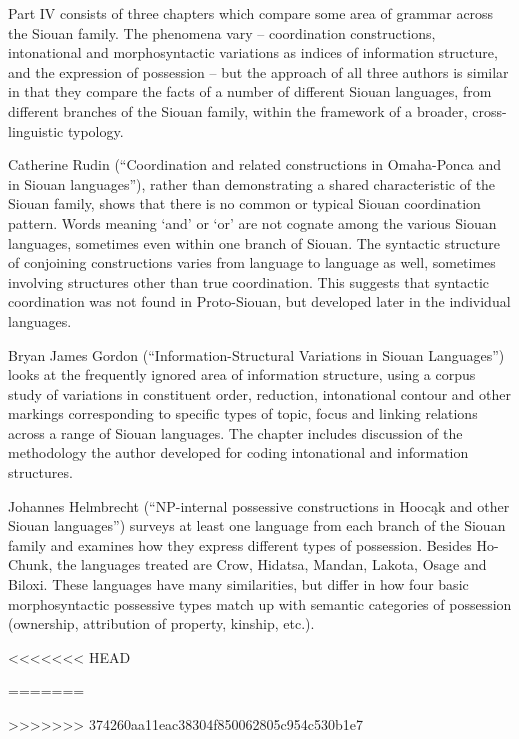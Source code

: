 \begin{refsection}

Part IV consists of three chapters which compare some area of grammar across the Siouan family. The phenomena vary -- coordination constructions, intonational and morphosyntactic variations as indices of information structure, and the expression of possession -- but the approach of all three authors is similar in that they compare the facts of a number of different Siouan languages, from different branches of the Siouan family, within the framework of a broader, cross-linguistic typology.

Catherine Rudin (``Coordination and related constructions in Omaha-Ponca and in Siouan languages''), rather than demonstrating a shared characteristic of the Siouan family, shows that there is no common or typical Siouan coordination pattern. Words meaning `and' or `or' are not cognate among the various Siouan languages, sometimes even within one branch of Siouan. The syntactic structure of conjoining constructions varies from language to language as well, sometimes involving structures other than true coordination. This suggests that syntactic coordination was not found in Proto-Siouan, but developed later in the individual languages.

Bryan James Gordon (``Information-Structural Variations in Siouan Languages'') looks at the frequently ignored area of information structure, using a corpus study of variations in constituent order, reduction, intonational contour and other markings corresponding to specific types of topic, focus and linking relations across a range of Siouan languages. The chapter includes discussion of the methodology the author developed for coding intonational and information structures.


Johannes Helmbrecht (``NP-internal possessive constructions in Hooc\k{a}k and other Siouan languages'') surveys at least one language from each branch of the Siouan family and examines how they express different types of possession. Besides Ho-Chunk, the languages treated are Crow, Hidatsa, Mandan, Lakota, Osage and Biloxi. These languages have many similarities, but differ in how four basic morphosyntactic possessive types match up with semantic categories of possession (ownership, attribution of property, kinship, etc.).


<<<<<<< HEAD
 
=======




>>>>>>> 374260aa11eac38304f850062805c954c530b1e7
\end{refsection}

